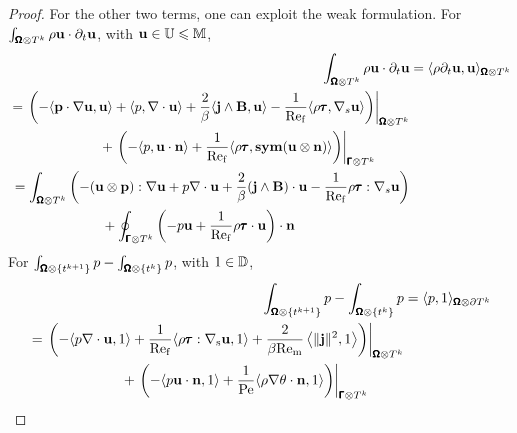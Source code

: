 \begin{proof}
            For the other two terms, one can exploit the weak formulation. For $\int_{\pmb{\mathsf{\Omega}}\otimes T^{k}}\rho\mathbf{u}\cdot\partial_{t}\mathbf{u}$, with $\mathbf{u}  \in  \mathbb{U}  \leqslant  \mathbb{M}$,
            \begin{align}
                \int_{\pmb{\mathsf{\Omega}}\otimes T^{k}}\rho\mathbf{u}\cdot\partial_{t}\mathbf{u}  &=  \langle\rho\partial_{t}\mathbf{u}, \mathbf{u}\rangle_{\pmb{\mathsf{\Omega}}\otimes T^{k}}  \\
                \begin{split}
                    &=  \left.\left(- \langle\mathbf{p}\cdot\nabla\mathbf{u}, \mathbf{u}\rangle + \langle p, \nabla\cdot\mathbf{u}\rangle + \frac{2}{\beta}\langle\mathbf{j}\wedge\mathbf{B}, \mathbf{u}\rangle - \frac{1}{\mathrm{Re}_{\mathrm{f}}}\langle\rho\pmb{\mathsf{\tau}}, \nabla_{s}\mathbf{u}\rangle\right)\right|_{\pmb{\mathsf{\Omega}}\otimes T^{k}}  \\
                    &\;\;\;\;\;\;\;\;\;\;\;\;\;\;\;\;\;\;\;\;\;\;\;\;  + \left.\left(- \langle p, \mathbf{u}\cdot\mathbf{n}\rangle + \frac{1}{\mathrm{Re}_{\mathrm{f}}}\langle\rho\pmb{\mathsf{\tau}}, \mathbf{sym}(\mathbf{u}\otimes\mathbf{n})\rangle\right)\right|_{\pmb{\mathsf{\Gamma}}\otimes T^{k}}
                \end{split}  \\
                \begin{split}
                    &=  \int_{\pmb{\mathsf{\Omega}}\otimes T^{k}}\left(- (\mathbf{u}\otimes\mathbf{p}):\nabla\mathbf{u} + p\nabla\cdot\mathbf{u} + \frac{2}{\beta}(\mathbf{j}\wedge\mathbf{B})\cdot\mathbf{u} - \frac{1}{\mathrm{Re}_{\mathrm{f}}}\rho\pmb{\mathsf{\tau}}:\nabla_{s}\mathbf{u}\right)  \\
                    &\;\;\;\;\;\;\;\;\;\;\;\;\;\;\;\;\;\;\;\;\;\;\;\;  + \oint_{\pmb{\mathsf{\Gamma}}\otimes T^{k}}\left(- p\mathbf{u} + \frac{1}{\mathrm{Re}_{\mathrm{f}}}\rho\pmb{\mathsf{\tau}}\cdot\mathbf{u}\right)\cdot\mathbf{n}
                \end{split}
            \end{align}
            For $\int_{\pmb{\mathsf{\Omega}}\otimes\left\{t^{k + 1}\right\}}p - \int_{\pmb{\mathsf{\Omega}}\otimes\left\{t^{k}\right\}}p$, with $1  \in  \mathbb{D}$,
            \begin{align}
                \int_{\bfOmega\otimes\left\{t^{k + 1}\right\}}p - \int_{\bfOmega\otimes\left\{t^{k}\right\}}p  &=  \langle p, 1\rangle_{\bfOmega\otimes\partial T^{k}}  \\
                \begin{split}
                    &=  \left.\left(- \langle p\nabla\cdot\bfu, 1\rangle + \frac{1}{\rmRef}\langle\rho\bftau:\nabla_{\rms}\bfu, 1\rangle + \frac{2}{\beta\rmRem}\left\langle\|\bfj\|^{2}, 1\right\rangle\right)\right|_{\bfOmega\otimes T^{k}}  \\
                    &\;\;\;\;\;\;\;\;\;\;\;\;\;\;\;\;\;\;\;\;\;\;\;\;+ \left.\left(- \langle p\bfu\cdot\bfn, 1\rangle + \frac{1}{\rmPe}\langle\rho\nabla\theta\cdot\bfn, 1\rangle\right)\right|_{\bfGamma\otimes T^{k}}

\end{split}
\end{align}
\end{proof}

